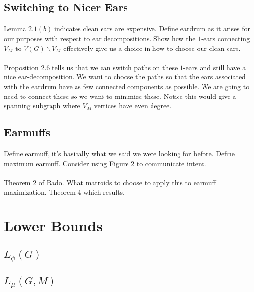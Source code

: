 \documentclass[letterpaper,12pt,oneside,onecolumn]{article}
\begin{document}
\subsection{Switching to Nicer Ears}
\paragraph{}
Lemma $2.1(b)$ indicates clean ears are expensive. Define eardrum as it arises for our purposes with respect to ear decompositions. Show how the $1$-ears connecting $V_M$ to $V(G)\backslash V_M$ effectively give us a choice in how to choose our clean ears.
\paragraph{}
Proposition $2.6$ tells us that we can switch paths on these $1$-ears and still have a nice ear-decomposition. We want to choose the paths so that the ears associated with the eardrum have as few connected components as possible. We are going to need to connect these so we want to minimize these. Notice this would give a spanning subgraph where $V_M$ vertices have even degree.
\subsection{Earmuffs}
\paragraph{}
Define earmuff, it's basically what we said we were looking for before. Define maximum earmuff. Consider using Figure $2$ to communicate intent.
\paragraph{}
Theorem $2$ of Rado. What matroids to choose to apply this to earmuff maximization. Theorem $4$ which results.
\section{Lower Bounds}
\subsection{$L_\phi(G)$}
\subsection{$L_\mu(G,M)$}
\end{document}
